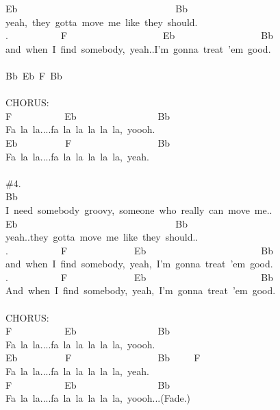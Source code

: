 {Eb\ \ \ \ \ \ \ \ \ \ \ \ \ \ \ \ \ \ \ \ \ \ \ \ \ \ \ \ \ \ \ \ \ Bb\ \\
yeah,\ they\ gotta\ move\ me\ like\ they\ should.\ \\
.\ \ \ \ \ \ \ \ \ \ \ F\ \ \ \ \ \ \ \ \ \ \ \ \ \ \ \ \ \ \ \ Eb\ \ \ \ \ \ \ \ \ \ \ \ \ \ \ \ \ \ Bb\ \\
and\ when\ I\ find\ somebody,\ yeah..I'm\ gonna\ treat\ 'em\ good.\ \\
\ \ \\
Bb\ Eb\ F\ Bb\ \ \ \\
\\
CHORUS:\ \ \\
F\ \ \ \ \ \ \ \ \ \ \ Eb\ \ \ \ \ \ \ \ \ \ \ \ \ \ \ \ \ Bb\ \ \ \ \ \ \ \ \ \\
Fa\ la\ la....fa\ la\ la\ la\ la\ la,\ yoooh.\ \\
Eb\ \ \ \ \ \ \ \ \ \ F\ \ \ \ \ \ \ \ \ \ \ \ \ \ \ \ \ \ Bb\ \ \ \ \ \\
Fa\ la\ la....fa\ la\ la\ la\ la\ la,\ yeah.\ \ \ \ \ \\
\ \ \\
\#4.\\
Bb\ \\
I\ need\ somebody\ groovy,\ someone\ who\ really\ can\ move\ me..\ \\
Eb\ \ \ \ \ \ \ \ \ \ \ \ \ \ \ \ \ \ \ \ \ \ \ \ \ \ \ \ \ \ \ \ \ Bb\ \\
yeah..they\ gotta\ move\ me\ like\ they\ should..\ \\
.\ \ \ \ \ \ \ \ \ \ \ F\ \ \ \ \ \ \ \ \ \ \ \ \ \ Eb\ \ \ \ \ \ \ \ \ \ \ \ \ \ \ \ \ \ \ \ \ \ \ \ Bb\ \\
and\ when\ I\ find\ somebody,\ yeah,\ I'm\ gonna\ treat\ 'em\ good.\ \\
.\ \ \ \ \ \ \ \ \ \ \ F\ \ \ \ \ \ \ \ \ \ \ \ \ \ Eb\ \ \ \ \ \ \ \ \ \ \ \ \ \ \ \ \ \ \ \ \ \ \ \ Bb\ \\
And\ when\ I\ find\ somebody,\ yeah,\ I'm\ gonna\ treat\ 'em\ good.\ \\
\\
CHORUS:\ \ \\
F\ \ \ \ \ \ \ \ \ \ \ Eb\ \ \ \ \ \ \ \ \ \ \ \ \ \ \ \ \ Bb\ \ \ \ \ \ \ \ \ \\
Fa\ la\ la....fa\ la\ la\ la\ la\ la,\ yoooh.\ \\
Eb\ \ \ \ \ \ \ \ \ \ F\ \ \ \ \ \ \ \ \ \ \ \ \ \ \ \ \ \ Bb\ \ \ \ \ F\ \\
Fa\ la\ la....fa\ la\ la\ la\ la\ la,\ yeah.\ \ \ \ \ \\
F\ \ \ \ \ \ \ \ \ \ \ Eb\ \ \ \ \ \ \ \ \ \ \ \ \ \ \ \ \ Bb\ \ \ \ \ \ \ \ \ \\
Fa\ la\ la....fa\ la\ la\ la\ la\ la,\ yoooh...(Fade.)}
